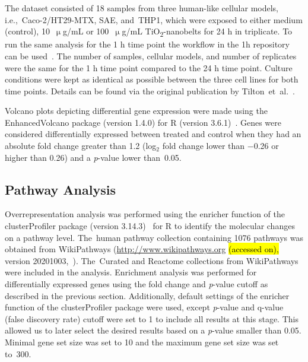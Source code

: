 \documentclass[ijms,article,accept,moreauthors,pdftex]{Definitions/mdpi}
\begin{document}
\begin{paracol}{2}
The dataset consisted of 18 samples from three human-like {cellular models}, i.e.,~{Caco-2/HT29-MTX}, SAE, and~THP1, which were exposed to either medium (control), 10~$\upmu$g/mL or 100~$\upmu$g/mL TiO\textsubscript{2}-nanobelts for 24 h in triplicate. {To run the same analysis for the 1 h time point the workflow in the 1h repository can be} used~\cite{TiO2-scripts-1h}. {The number of samples, cellular models, and number of replicates were the same for the 1 h time point compared to the 24 h time point.} Culture conditions were kept as identical as possible between the three cell lines {for both time points}. Details can be found via the original publication by \mbox{Tilton~{et al.}~\cite{Tilton2013}.}

Volcano plots depicting differential gene expression were made using the EnhancedVolcano package (version 1.4.0) for R (version 3.6.1)~\cite{R2020,VolcanoPlot}. Genes were considered differentially expressed between treated and control when they had an absolute fold change greater than 1.2 (log$_{2}$ fold change lower than $-$0.26 or higher than 0.26) and a \emph{p}-value lower than~0.05. 

\subsection{Pathway Analysis}
Overrepresentation analysis was performed using the enricher function of the clusterProfiler package (version 3.14.3)~\cite{Yu2012} for R to identify the molecular changes on a pathway level. The~human pathway collection containing 1076 pathways was obtained from WikiPathways (\url{http://www.wikipathways.org} \hl{(accessed on),} %
 version 20201003,~\cite{Martens2020}). The~Curated and Reactome collections from WikiPathways were included in the analysis. Enrichment analysis was performed for differentially expressed genes using the fold change and \emph{p}-value cutoff as described in the previous section. Additionally, default settings of the enricher function of the clusterProfiler package were used, except \emph{p}-value and q-value (false discovery rate) cutoff were set to 1 to include all results at this stage. This allowed us to later select the desired results based on a \emph{p}-value smaller than 0.05. Minimal gene set size was set to 10 and the maximum gene set size was set to~300.


\end{paracol}
\end{document}
